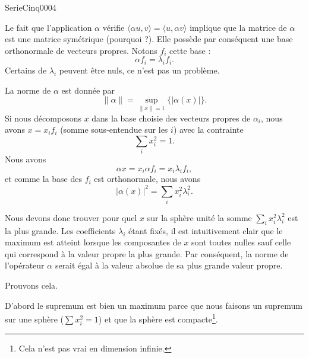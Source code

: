 
\begin{corrige}{SerieCinq0004}

	Le fait que l'application $\alpha$ vérifie $\langle \alpha u, v\rangle =\langle u, \alpha v\rangle $ implique que la matrice de $\alpha$ est une matrice symétrique (pourquoi ?). Elle possède par conséquent une base orthonormale de vecteurs propres. Notons $f_i$ cette base :
	\begin{equation}
		\alpha f_i=\lambda_if_i.
	\end{equation}
	Certains de $\lambda_i$ peuvent être nuls, ce n'est pas un problème.

	La norme de $\alpha$ est donnée par
	\begin{equation}
		\| \alpha \|=\sup_{\| x \|=1}\{ | \alpha(x) | \}.
	\end{equation}
	Si nous décomposons $x$ dans la base choisie des vecteurs propres de $\alpha_i$, nous avons $x=x_if_i$ (somme sous-entendue sur les $i$) avec la contrainte
	\begin{equation}
		\sum_ix_i^2=1.
	\end{equation}
	Nous avons 
	\begin{equation}
		\alpha x=x_i\alpha f_i=x_i\lambda_if_i,
	\end{equation}
	et comme la base des $f_i$ est orthonormale, nous avons
	\begin{equation}
		| \alpha(x) |^2=\sum_ix_i^2\lambda_i^2.
	\end{equation}

	Nous devons donc trouver pour quel $x$ sur la sphère unité la somme $\sum_ix_i^2\lambda_i^2$ est la plus grande. Les coefficients $\lambda_i$ étant fixés, il est intuitivement clair que le maximum est atteint lorsque les composantes de $x$ sont toutes nulles sauf celle qui correspond à la valeur propre la plus grande. Par conséquent, la norme de l'opérateur $\alpha$ serait égal à la valeur absolue de sa plus grande valeur propre.

	Prouvons cela.

	D'abord le supremum est bien un maximum parce que nous faisons un supremum sur une sphère ($\sum x_i^2=1$) et que la sphère est compacte\footnote{Cela n'est pas vrai en dimension infinie.}.


\end{corrige}
